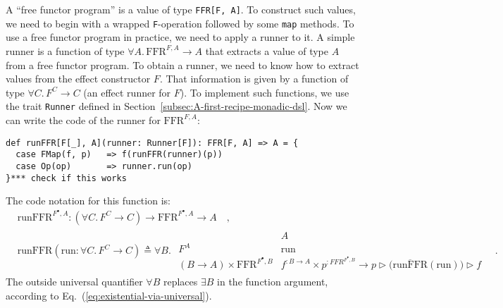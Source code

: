 A \textsf{``}free functor program\textsf{''} is a value of type \lstinline!FFR[F, A]!.
To construct such values, we need to begin with a wrapped \lstinline!F!-operation
followed by some \lstinline!map!
methods. To use a free functor program in practice, we need to apply
a runner to it. A simple runner is a function of type $\forall A.\,\text{FFR}^{F,A}\rightarrow A$
that extracts a value of type $A$ from a free functor program. To
obtain a runner, we need to know how to extract values from the effect
constructor $F$. That information is given by a function of type
$\forall C.\,F^{C}\rightarrow C$ (an effect
runner for $F$). To implement such functions, we use the trait \lstinline!Runner!
defined in Section~\ref{subsec:A-first-recipe-monadic-dsl}. Now
we can write the code of the runner for $\text{FFR}^{F,A}$:
\begin{lstlisting}
def runFFR[F[_], A](runner: Runner[F]): FFR[F, A] => A = {
  case FMap(f, p)   => f(runFFR(runner)(p))
  case Op(op)       => runner.run(op)
}*** check if this works
\end{lstlisting}
The code notation for this function is:
\begin{align*}
 & \text{runFFR}^{F^{\bullet},A}:(\forall C.\,F^{C}\rightarrow C)\rightarrow\text{FFR}^{F^{\bullet},A}\rightarrow A\quad,\\
 & \text{runFFR}(\text{run}:\forall C.\,F^{C}\rightarrow C)\triangleq\forall B.\,\,\begin{array}{|c||c|}
 & A\\
\hline F^{A} & \text{run}\\
(B\rightarrow A)\times\text{FFR}^{F^{\bullet},B} & f^{:B\rightarrow A}\times p^{:FFR^{F^{\bullet},B}}\rightarrow p\triangleright\big(\overline{\text{runFFR}}(\text{run})\big)\triangleright f
\end{array}\quad.
\end{align*}
The outside universal quantifier $\forall B$ replaces $\exists B$
in the function argument, according to Eq.~(\ref{eq:existential-via-universal}).

